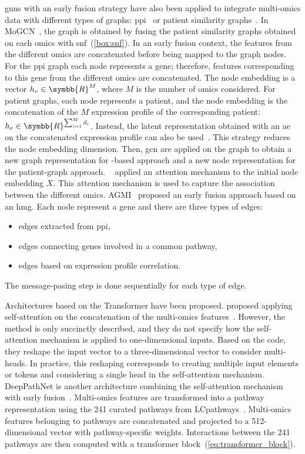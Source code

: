 \documentclass[../main.tex]{subfiles}
\begin{document}
		\Glspl{gnn} with an early fusion strategy have also been applied to integrate multi-omics data with different types of graphs: \gls{ppi}~\cite{Althubaiti_2021,Guo2023} or patient similarity graphs~\cite{MoGCN}.
		In MoGCN~\cite{MoGCN}, the graph is obtained by fusing the patient similarity graphs obtained on each omics with \gls{snf}~(\cref{box:snf}).
		In an early fusion context, the features from the different omics are concatenated before being mapped to the graph nodes.
		For the \gls{ppi} graph each node represents a gene; therefore, features corresponding to this gene from the different omics are concatenated.
		The node embedding is a vector \(h_{v} \in \symbb{R}^{M}\), where \(M\) is the number of omics considered.
		For patient graphs, each node represents a patient, and the node embedding is the concatenation of the \(M\) expression profile of the corresponding patient: \(h_{v} \in \symbb{R}^{\sum_{i=1}^{M}d_i}\).
		Instead, the latent representation obtained with an \gls{ae} on the concatenated expression profile can also be used~\cite{MoGCN}.
		This strategy reduces the node embedding dimension.
		Then, \gls{gcn} are applied on the graph to obtain a new graph representation for -based approach and a new node representation for the patient-graph approach.
		\citeauthor{Guo2023}~\cite{Guo2023} applied an attention mechanism to the initial node embedding \(X\).
		This attention mechanism is used to capture the association between the different omics.
		AGMI~\cite{AGMI} proposed an early fusion approach based on an \gls{hmg}.
		Each node represent a gene and there are three types of edges:
		\begin{itemize}[nosep]
			\item edges extracted from \gls{ppi},
			\item edges connecting genes involved in a common pathway,
			\item edges based on expression profile correlation.
		\end{itemize}
		The message-pasing step is done sequentially for each type of edge.

		Architectures based on the Transformer have been proposed.
		\citeauthor{SubtypeFormer} proposed applying self-attention on the concatenation of the multi-omics features~\cite{SubtypeFormer}.
		However, the method is only succinctly described, and they do not specify how the self-attention mechanism is applied to one-dimensional inputs.
		Based on the code, they reshape the input vector to a three-dimensional vector to consider multi-heads.
		In practice, this reshaping corresponds to creating multiple input elements or tokens and considering a single head in the self-attention mechanism.
		DeepPathNet is another architecture combining the self-attention mechanism with early fusion~\cite{DeepPathNet}.
		Multi-omics features are transformed into a pathway representation using the 241 curated pathways from LCpathways~\cite{LCpathways}.
		Multi-omics features belonging to pathways are concatenated and projected to a 512-dimensional vector with pathway-specific weights.
		Interactions between the 241 pathways are then computed with a transformer block~(\cref{eq:transformer_block}).
\end{document}
